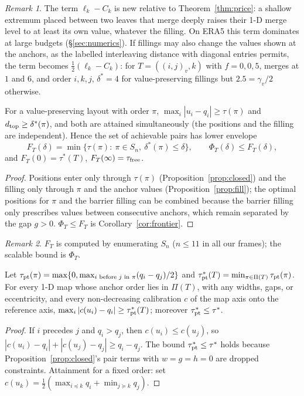 \documentclass[11pt]{article}
\theoremstyle{remark}\newtheorem{remark}{Remark}
\begin{document}
\begin{remark}The term $\ell_k-C_k$ is new relative to Theorem~\ref{thm:price}: a shallow extremum placed between two leaves that merge deeply raises their 1-D merge level to at least its own value, whatever the filling. On ERA5 this term dominates at large budgets (\S\ref{sec:numerics}). If fillings may also change the values shown at the anchors, as the labelled interleaving distance with diagonal entries permits, the term becomes $\frac12(\ell_k-C_k)$: for $T=((i,j)_v,k)$ with $f=0,0,5$, merges at $1$ and $6$, and order $i,k,j$, $\delta^*=4$ for value-preserving fillings but $2.5=\gamma_v/2$ otherwise.\end{remark}

\begin{theorem}\label{thm:exactfrontier}
For a value-preserving layout with order $\pi$, $\max_i|u_i-q_i|\ge\tau(\pi)$ and $d_{\rm top}\ge\delta^*(\pi)$, and both are attained simultaneously (the positions and the filling are independent). Hence the set of achievable pairs has lower envelope
\[F_T(\delta)=\min\{\tau(\pi):\ \pi\in S_n,\ \delta^*(\pi)\le\delta\},\qquad \Phi_T(\delta)\le F_T(\delta),\]
and $F_T(0)=\tau^*(T)$, $F_T(\infty)=\tau_{\rm free}$.
\end{theorem}
\begin{proof}Positions enter only through $\tau(\pi)$ (Proposition~\ref{prop:closed}) and the filling only through $\pi$ and the anchor values (Proposition~\ref{prop:fill}); the optimal positions for $\pi$ and the barrier filling can be combined because the barrier filling only prescribes values between consecutive anchors, which remain separated by the gap $g>0$. $\Phi_T\le F_T$ is Corollary~\ref{cor:frontier}.\end{proof}
\begin{remark}$F_T$ is computed by enumerating $S_n$ ($n\le11$ in all our frames); the scalable bound is $\Phi_T$.\end{remark}

\begin{proposition}\label{prop:ptcert}
Let $\tau_{\rm pt}(\pi)=\max\{0,\max_{i\text{ before }j\text{ in }\pi}(q_i-q_j)/2\}$ and $\tau^*_{\rm pt}(T)=\min_{\pi\in\Pi(T)}\tau_{\rm pt}(\pi)$. For every 1-D map whose anchor order lies in $\Pi(T)$, with any widths, gaps, or eccentricity, and every non-decreasing calibration $c$ of the map axis onto the reference axis, $\max_i|c(u_i)-q_i|\ge\tau^*_{\rm pt}(T)$; moreover $\tau^*_{\rm pt}\le\tau^*$.
\end{proposition}
\begin{proof}If $i$ precedes $j$ and $q_i>q_j$, then $c(u_i)\le c(u_j)$, so $|c(u_i)-q_i|+|c(u_j)-q_j|\ge q_i-q_j$. The bound $\tau^*_{\rm pt}\le\tau^*$ holds because Proposition~\ref{prop:closed}'s pair terms with $w=g=h=0$ are dropped constraints. Attainment for a fixed order: set $c(u_k)=\frac12(\max_{i\preceq k}q_i+\min_{j\succeq k}q_j)$.\end{proof}
\end{document}
